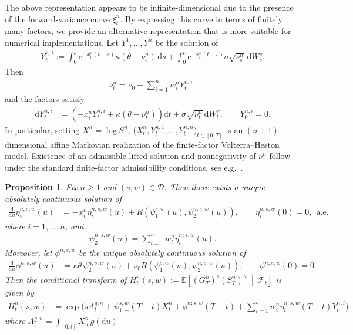 \documentclass[10pt,a4paper,reqno]{amsart}
\theoremstyle{plain}
\newtheorem{proposition}[theorem]{Proposition}
\theoremstyle{definition}
\theoremstyle{remark}
\theoremstyle{example}
\begin{document}
The above representation appears to be infinite-dimensional due to the presence of the forward-variance curve $\xi_t^n$. By expressing this curve in terms of finitely many factors, we provide an alternative representation that is more suitable for numerical implementations. Let $Y^1,\dots, Y^n$ be the solution of
\begin{align}\label{eq:lifted-factors-definition}
    Y_t^{n,i} := \int_0^t \mathrm e^{-x_i^n(t-s)} \kappa(\theta-\nu_s^n)\, \mathrm ds + \int_0^t \mathrm e^{-x_i^n(t-s)} \sigma\sqrt{\nu_s^n}\, \mathrm dW_s^\nu.
\end{align}
Then
\begin{align}\label{eq:variance-factor-representation}
    \nu_t^n = \nu_0 + \sum_{i=1}^n w_i^nY_t^{n,i},
\end{align}
and the factors satisfy
\begin{align}\label{eq:factor-SDE}
    \mathrm dY_t^{n,i} &= \left( - x_i^nY_t^{n,i} + \kappa(\theta-\nu_t^n) \right)\mathrm dt + \sigma\sqrt{\nu_t^n}\, \mathrm dW_t^\nu, \qquad Y_0^{n,i}=0.
\end{align}
In particular, setting $X^n = \log S^n$,  $( X_t^n, Y_t^{n,1}, \ldots, Y_t^{n,n}\bigr)_{t\in[0,T]}$ is an $(n+1)$-dimensional affine Markovian realization of the finite-factor Volterra--Heston model. Existence of an admissible lifted solution and nonnegativity of $\nu^n$ follow under the standard finite-factor admissibility conditions, see e.g.~\cite[Appendix~A.1]{abi2019lifting}.
    
\begin{proposition}\label{prop:finite-dimensional-Riccati-lift}
    Fix $n \geq 1$ and $(s,w) \in \mathcal{D}$. Then there exists a unique absolutely continuous solution of
    \begin{align}\label{eq:lifted-Riccati-eta}
        \frac{\mathrm d}{\mathrm du} \eta_i^{n;s,w}(u) &= - x_i^n\eta_i^{n;s,w}(u) + R\left( \psi_1^{s,w}(u), \psi_2^{n;s,w}(u) \right), \qquad \eta_i^{n;s,w}(0) = 0, \ \ \text{a.e.} 
    \end{align}
    where $i = 1,\dots, n$, and
    \begin{align}\label{eq:lifted-psi2-factor-sum}
        \psi_2^{n;s,w}(u) = \sum_{i=1}^n w_i^n\eta_i^{n;s,w}(u).
    \end{align}
    Moreover, let $\phi^{n;s,w}$ be the unique absolutely continuous solution of
    \begin{align}\label{eq:lifted-Riccati-phi}
        \frac{\mathrm d}{\mathrm du} \phi^{n;s,w}(u) &= \kappa\theta\, \psi_2^{n;s,w}(u) + \nu_0 R\left(\psi_1^{s,w}(u), \psi_2^{n;s,w}(u) \right), \qquad \phi^{n;s,w}(0)=0.
    \end{align}
    Then the conditional transform of $H_t^n(s,w) := \mathbb E\left[ (G_{T}^n)^s(S_T^n)^w \,\middle|\, \mathcal F_t \right]$ is given by
    \begin{align}\label{eq:lifted-affine-transform}
        H_t^n(s,w) &= \exp\Bigg( sA_t^{g,n} + \psi_{1,-}^{s,w}(T-t)X_t^n + \phi^{n;s,w}(T-t) + \sum_{i=1} ^n w_i^n \eta_i^{n;s,w}(T-t) Y_t^{n,i} \Bigg)
    \end{align}
    where $A_t^{g,n} = \int_{[0,t]}X_u^n\, g(\mathrm{d}u)$
\end{proposition}
\end{document}
